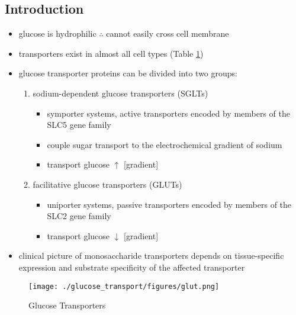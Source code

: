 \documentclass{scrartcl}
\begin{document}
\subsection{Introduction}
\label{sec:orgbc519a6}
\begin{itemize}
\item glucose is hydrophilic \(\therefore\) cannot easily cross cell membrane
\item transporters exist in almost all cell types (Table \ref{fig:org6fc6fbf})
\item glucose transporter proteins can be divided into two groups:
\begin{enumerate}
\item sodium-dependent glucose transporters (SGLTs)
\begin{itemize}
\item symporter systems, active transporters encoded by members of
the SLC5 gene family
\item couple sugar transport to the electrochemical gradient of sodium
\item transport glucose \(\uparrow\) [gradient]
\end{itemize}
\item facilitative glucose transporters (GLUTs)
\begin{itemize}
\item uniporter systems, passive transporters encoded by members of the SLC2 gene family
\item transport glucose \(\downarrow\) [gradient]
\end{itemize}
\end{enumerate}
\item clinical picture of monosaccharide transporters depends on tissue-specific expression and
substrate specificity of the affected transporter
\end{itemize}

\begin{figure}[htbp]
\centering
\texttt{[image: ./glucose\_transport/figures/glut.png]}
\caption[glucose transporters]{\label{fig:org6fc6fbf}
Glucose Transporters}
\end{figure}
\end{document}
